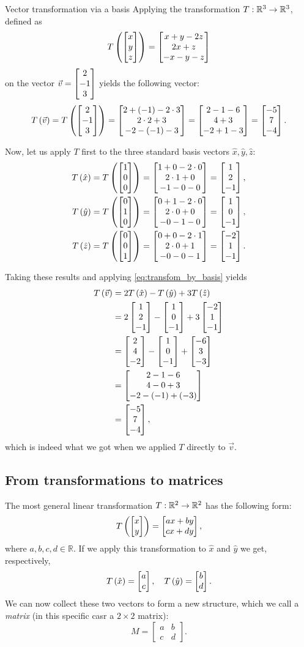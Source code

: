 \begin{example}{Vector transformation via a basis}{}
	Applying the transformation $T:\mathbb{R}^{3}\to\mathbb{R}^{3}$, defined as
	\[
		T\left(\colvec{x;y;z}\right)=\colvec{x+y-2z;2x+z;-x-y-z}
	\]
	on the vector $\vec{v}=\colvec{2;-1;3}$ yields the following vector:
	\[
		T\left(\vec{v}\right) = T\left(\colvec{2;-1;3}\right) = \colvec{2+(-1)-2\cdot3;2\cdot2+3;-2-(-1)-3} = \colvec{2-1-6;4+3;-2+1-3} = \colvec{-5;7;-4}.
	\]

	Now, let us apply $T$ first to the three standard basis vectors $\hat{x},\hat{y},\hat{z}$:
	\begin{align*}
		T\left( \hat{x} \right) &= T\left(\colvec{1;0;0}\right) = \colvec{1+0-2\cdot0;2\cdot1+0;-1-0-0} = \colvec{1;2;-1},\\
		T\left( \hat{y} \right) &= T\left(\colvec{0;1;0}\right) = \colvec{0+1-2\cdot0;2\cdot0+0;-0-1-0} = \colvec{1;0;-1},\\
		T\left( \hat{z} \right) &= T\left(\colvec{0;0;1}\right) = \colvec{0+0-2\cdot1;2\cdot0+1;-0-0-1} = \colvec{-2;1;-1}.
	\end{align*}

	Taking these results and applying \autoref{eq:transfom_by_basis} yields
	\begin{align*}
		T\left( \vec{v} \right) &= 2T \left( \hat{x} \right) -T \left( \hat{y} \right) + 3T \left( \hat{z} \right)\\
								&= 2\colvec{1;2;-1} - \colvec{1;0;-1} + 3\colvec{-2;1;-1}\\
								&= \colvec{2;4;-2} - \colvec{1;0;-1} + \colvec{-6;3;-3}\\
								&= \colvec{2-1-6;4-0+3;-2-(-1)+(-3)}\\
								&= \colvec{-5;7;-4},
	\end{align*}
	which is indeed what we got when we applied $T$ directly to $\vec{v}$.
\end{example}

\subsection{From transformations to matrices}
The most general linear transformation $T:\mathbb{R}^{2}\to\mathbb{R}^{2}$ has the following form:
\begin{equation}
	T \left( \colvec{x;y} \right) = \colvec{ax+by;cx+dy},
	\label{eq:generic_R2_LT}
\end{equation}
where $a,b,c,d\in\mathbb{R}$. If we apply this transformation to $\hat{x}$ and $\hat{y}$ we get, respectively,
\begin{equation}
	T \left( \hat{x} \right) = \colvec{a;c},\quad T \left( \hat{y} \right) = \colvec{b;d}.
	\label{eq:}
\end{equation}
We can now collect these two vectors to form a new structure, which we call a \emph{matrix} (in this specific casr a $2\times2$ matrix):
\begin{equation}
	M = \begin{bmatrix} a&b\\c&d \end{bmatrix}.
	\label{eq:matrix}
\end{equation}

